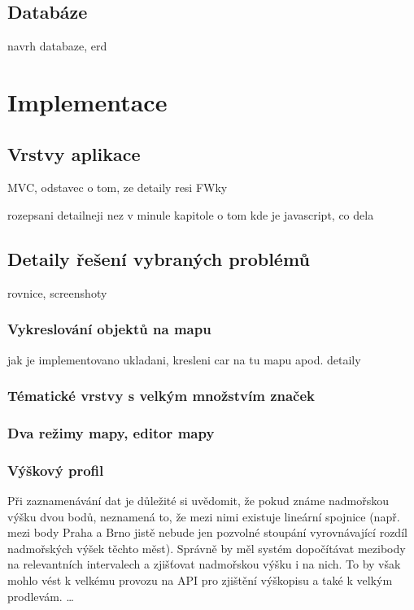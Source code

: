 \section{Databáze}
navrh databaze, erd

\chapter{Implementace}

\section{Vrstvy aplikace}
MVC, odstavec o tom, ze detaily resi FWky

rozepsani detailneji nez v minule kapitole o tom kde je javascript,
co dela

\section{Detaily řešení vybraných problémů}
rovnice, screenshoty

\subsection{Vykreslování objektů na mapu}
jak je implementovano ukladani, kresleni car na tu mapu
apod. detaily

\subsection{Tématické vrstvy s velkým množstvím značek}

\subsection{Dva režimy mapy, editor mapy}

\subsection{Výškový profil}
Při zaznamenávání dat je důležité si uvědomit, že pokud známe
nadmořskou výšku dvou bodů, neznamená to, že mezi nimi existuje
lineární spojnice (např. mezi body Praha a Brno jistě nebude jen
pozvolné stoupání vyrovnávající rozdíl nadmořských výšek těchto
měst). Správně by měl systém dopočítávat mezibody na relevantních
intervalech a zjišťovat nadmořskou výšku i na nich. To by však mohlo
vést k velkému provozu na API pro zjištění výškopisu a také k velkým
prodlevám. \ldots

